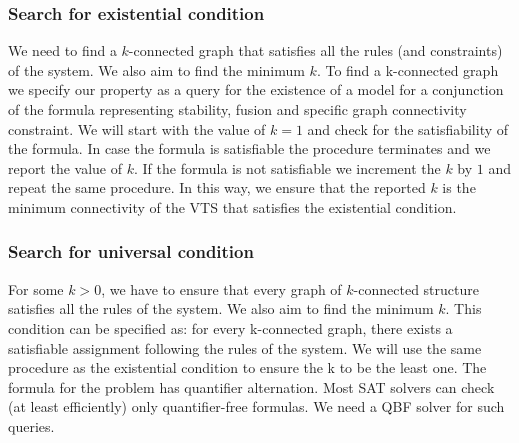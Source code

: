 \subsubsection{Search for existential condition} 
%
%
We need to find a $k$-connected graph that satisfies all the rules (and constraints) of the system. 
%
We also aim to find the minimum $k$. 
%
%
To find a k-connected graph we specify our property as a query for the existence
of a model for a conjunction of the formula representing stability, fusion and specific
graph connectivity constraint. 
%
%
We will start with the value of $k = 1$ and check for the satisfiability of the formula.
%
In case the formula is satisfiable the procedure terminates and we report the value of $k$. 
%
If the formula is not satisfiable we increment the $k$ by $1$ and repeat the same procedure. 
%
In this way, we ensure that the reported $k$ is the minimum connectivity of the VTS that
satisfies the existential condition.
%


\subsubsection{Search for universal condition}
%
For some $k>0$,
we have to ensure that every graph of $k$-connected structure satisfies all
the rules of the system.
%
We also aim to find the minimum $k$. 
%
This condition can be specified as: for every k-connected graph, there exists a satisfiable assignment following the rules of the system. 
%
%
We will use the same procedure as the existential condition to ensure the k to be the least one.
%
The formula for the problem has quantifier alternation. 
%
Most SAT solvers can check (at least efficiently) only quantifier-free formulas.
%
We need a QBF solver for such queries.
%




          
